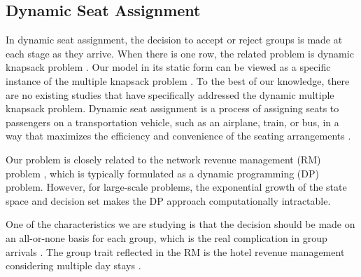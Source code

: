 


\subsection{Dynamic Seat Assignment}
In dynamic seat assignment, the decision to accept or reject groups is made at each stage as they arrive. When there is one row, the related problem is dynamic knapsack problem \cite{kleywegt1998dynamic}. Our model in its static form can be viewed as a specific instance of the multiple knapsack problem \cite{pisinger1999exact}. To the best of our knowledge, there are no existing studies that have specifically addressed the dynamic multiple knapsack problem. Dynamic seat assignment is a process of assigning seats to passengers on a transportation vehicle, such as an airplane, train, or bus, in a way that maximizes the efficiency and convenience of the seating arrangements \cite{hamdouch2011schedule, berge1993demand, zhu2023assign}. 



Our problem is closely related to the network revenue management (RM) problem \cite{williamson1992airline}, which is typically formulated as a dynamic programming (DP) problem. However, for large-scale problems, the exponential growth of the state space and decision set makes the DP approach computationally intractable. 


One of the characteristics we are studying is that the decision should be made on an all-or-none basis for each group, which is the real complication in group arrivals \cite{talluri2006theory}. The group trait reflected in the RM is the hotel revenue management considering multiple day stays \cite{aydin2018decomposition, bitran1995application}. 



